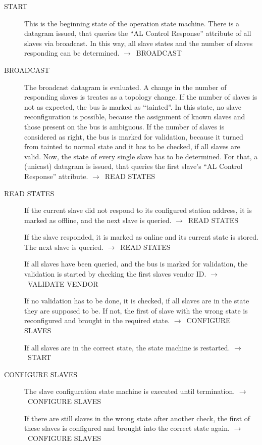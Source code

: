 \documentclass[a4paper,12pt,BCOR6mm,bibtotoc,idxtotoc]{scrbook}
\begin{document}
\begin{description}
\item[START] This is the beginning state of the operation state
  machine. There is a datagram issued, that queries the ``AL Control
  Response'' attribute \cite[section~5.3.2]{alspec} of all slaves via
  broadcast. In this way, all slave states and the number of slaves
  responding can be determined.  $\rightarrow$~BROADCAST

\item[BROADCAST] The broadcast datagram is evaluated. A change in the
  number of responding slaves is treates as a topology change. If the
  number of slaves is not as expected, the bus is marked as
  ``tainted''. In this state, no slave reconfiguration is possible,
  because the assignment of known slaves and those present on the bus
  is ambiguous. If the number of slaves is considered as right, the
  bus is marked for validation, because it turned from tainted to
  normal state and it has to be checked, if all slaves are valid. Now,
  the state of every single slave has to be determined. For that, a
  (unicast) datagram is issued, that queries the first slave's ``AL
  Control Response'' attribute. $\rightarrow$~READ STATES

\item[READ STATES] If the current slave did not respond to its
  configured station address, it is marked as offline, and the next
  slave is queried. $\rightarrow$~READ STATES

  If the slave responded, it is marked as online and its current state
  is stored. The next slave is queried. $\rightarrow$~READ STATES

  If all slaves have been queried, and the bus is marked for
  validation, the validation is started by checking the first slaves
  vendor ID. $\rightarrow$~VALIDATE VENDOR

  If no validation has to be done, it is checked, if all slaves are in
  the state they are supposed to be. If not, the first of slave with
  the wrong state is reconfigured and brought in the required state.
  $\rightarrow$~CONFIGURE SLAVES

  If all slaves are in the correct state, the state machine is
  restarted. $\rightarrow$~START

\item[CONFIGURE SLAVES] The slave configuration state machine is
  executed until termination. $\rightarrow$~CONFIGURE SLAVES

  If there are still slaves in the wrong state after another check,
  the first of these slaves is configured and brought into the correct
  state again. $\rightarrow$~CONFIGURE SLAVES


\end{description}
\end{document}
